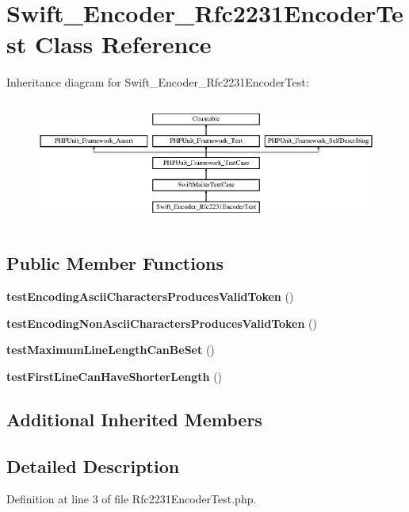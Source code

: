 \section{Swift\+\_\+\+Encoder\+\_\+\+Rfc2231\+Encoder\+Test Class Reference}
\label{class_swift___encoder___rfc2231_encoder_test}
Inheritance diagram for Swift\+\_\+\+Encoder\+\_\+\+Rfc2231\+Encoder\+Test\+:\begin{figure}[H]
\begin{center}
\leavevmode
\includegraphics[height=4.111601cm]{class_swift___encoder___rfc2231_encoder_test}
\end{center}
\end{figure}
\subsection*{Public Member Functions}
\begin{DoxyCompactItemize}
\item 
{\bf test\+Encoding\+Ascii\+Characters\+Produces\+Valid\+Token} ()
\item 
{\bf test\+Encoding\+Non\+Ascii\+Characters\+Produces\+Valid\+Token} ()
\item 
{\bf test\+Maximum\+Line\+Length\+Can\+Be\+Set} ()
\item 
{\bf test\+First\+Line\+Can\+Have\+Shorter\+Length} ()
\end{DoxyCompactItemize}
\subsection*{Additional Inherited Members}


\subsection{Detailed Description}


Definition at line 3 of file Rfc2231\+Encoder\+Test.\+php.



